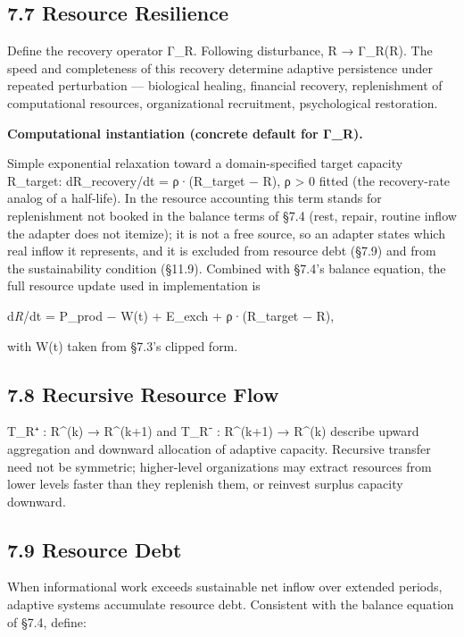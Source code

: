 \documentclass[
]{article}
\begin{document}
\hypertarget{resource-resilience}{%
\subsection{7.7 Resource Resilience}\label{resource-resilience}}

Define the recovery operator Γ\_R. Following disturbance, R → Γ\_R(R).
The speed and completeness of this recovery determine adaptive
persistence under repeated perturbation --- biological healing,
financial recovery, replenishment of computational resources,
organizational recruitment, psychological restoration.

\textbf{Computational instantiation (concrete default for Γ\_R).}

Simple exponential relaxation toward a domain-specified target capacity
R\_target: dR\_recovery/dt = ρ·(R\_target − R), ρ \textgreater{} 0
fitted (the recovery-rate analog of a half-life). In the resource
accounting this term stands for replenishment not booked in the balance
terms of §7.4 (rest, repair, routine inflow the adapter does not
itemize); it is not a free source, so an adapter states which real
inflow it represents, and it is excluded from resource debt (§7.9) and
from the sustainability condition (§11.9). Combined with §7.4's balance
equation, the full resource update used in implementation is

d\emph{R}/dt = P\_prod − W(t) + E\_exch + ρ·(R\_target − R),

with W(t) taken from §7.3's clipped form.

\hypertarget{recursive-resource-flow}{%
\subsection{7.8 Recursive Resource Flow}\label{recursive-resource-flow}}

T\_R⁺ : R\^{}(k) → R\^{}(k+1) and T\_R⁻ : R\^{}(k+1) → R\^{}(k) describe
upward aggregation and downward allocation of adaptive capacity.
Recursive transfer need not be symmetric; higher-level organizations may
extract resources from lower levels faster than they replenish them, or
reinvest surplus capacity downward.

\hypertarget{resource-debt}{%
\subsection{7.9 Resource Debt}\label{resource-debt}}

When informational work exceeds sustainable net inflow over extended
periods, adaptive systems accumulate resource debt. Consistent with the
balance equation of §7.4, define:
\end{document}
